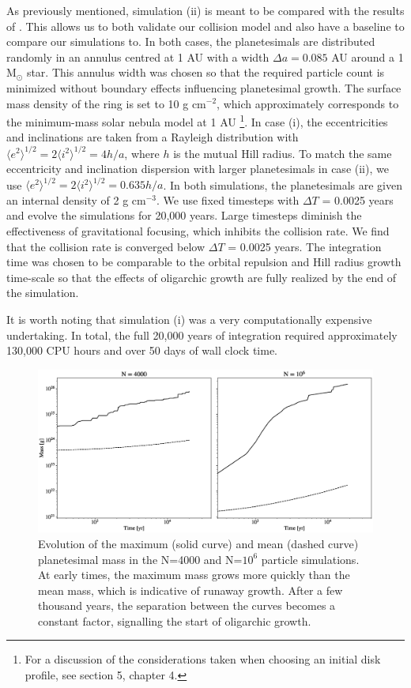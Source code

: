 \noindent As previously mentioned, simulation (ii) is meant to be compared with the results of \cite{kokubo98}. This allows us to 
both validate our collision model and also have a baseline to compare our simulations to. In both cases, the planetesimals are 
distributed randomly in an annulus centred at 1 AU with a width $\Delta a = 0.085$ AU around a 1 $\mathrm{M_{\odot}}$ star. 
This annulus width was chosen so that the required particle count is minimized without boundary effects influencing planetesimal 
growth. The surface mass density of the ring is set to 10 g cm$^{-2}$, which approximately corresponds to the minimum-mass 
solar nebula model \cite{hayashi81} at 1 AU \footnote{For a discussion of the considerations taken when choosing an initial disk profile, see section 5, chapter 4.}. In case (i), the eccentricities and inclinations are taken from a Rayleigh distribution 
\cite{ida92} with $\langle e^2 \rangle^{1/2} = 2 \langle i^2 \rangle^{1/2} = 4 h/a$, where $h$ is the mutual Hill radius. To match 
the same eccentricity and inclination dispersion with larger planetesimals in case (ii), we use $\langle e^2 \rangle^{1/2} = 2 
\langle i^2 \rangle^{1/2} = 0.635 h/a$. In both simulations, the planetesimals are given an internal density of 2 g cm$^{-3}$. We 
use fixed timesteps with $\Delta T$ = 0.0025 years and evolve the simulations for 20,000 years. Large timesteps diminish the 
effectiveness of gravitational focusing, which inhibits the collision rate. We find that the collision rate is converged below $\Delta 
T$ = 0.0025 years. The integration time was chosen to be comparable to the orbital repulsion and Hill radius growth time-scale 
\cite{kokubo95} so that the effects of oligarchic growth are fully realized by the end of the simulation.

It is worth noting that simulation (i) was a very computationally expensive undertaking. In total, the full 20,000 years of 
integration required approximately 130,000 CPU hours and over 50 days of wall clock time.

\begin{figure}
    \includegraphics[width=\textwidth]{figures/plSS/mass_evo.eps}
    \caption{Evolution of the maximum (solid curve) and mean (dashed curve) planetesimal mass in the N=4000 and N=$10^6$ particle simulations. At early times, the maximum mass grows more quickly than the mean mass, which is indicative of runaway growth. After a few thousand years, the separation between the curves becomes a constant factor, signalling the start of oligarchic growth.
    \label{fig:mass_evo}}
\end{figure}


